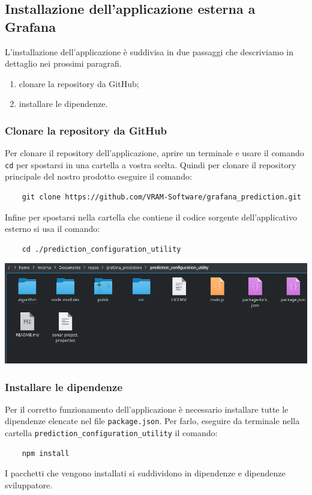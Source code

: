 \subsection{Installazione dell'applicazione esterna a Grafana}
L'installazione dell'applicazione è suddivisa in due passaggi che descriviamo in dettaglio nei prossimi paragrafi.
\begin{enumerate}
    \item clonare la repository da GitHub;
    \item installare le dipendenze.
\end{enumerate}

\subsubsection{Clonare la repository da GitHub}%
Per clonare il repository dell'applicazione, aprire un terminale e usare il comando \texttt{cd} per spostarsi in una cartella a vostra scelta. Quindi per clonare il repository principale del nostro prodotto eseguire il comando:
\begin{verbatim}
	git clone https://github.com/VRAM-Software/grafana_prediction.git
\end{verbatim}
Infine per spostarsi nella cartella che contiene il codice sorgente dell'applicativo esterno si usa il comando:
\begin{verbatim}
	cd ./prediction_configuration_utility
\end{verbatim}

\begin{center}
	\includegraphics[width=\textwidth,height=\textheight,keepaspectratio]{img/directoryProject.png}
\end{center}



\subsubsection{Installare le dipendenze}%
Per il corretto funzionamento dell'applicazione è necessario installare tutte le dipendenze elencate nel file \texttt{package.json}. Per farlo, eseguire da terminale nella cartella \verb|prediction_configuration_utility| il comando:
\begin{verbatim}
	npm install
\end{verbatim}
I pacchetti che vengono installati si suddividono in dipendenze e dipendenze sviluppatore.

